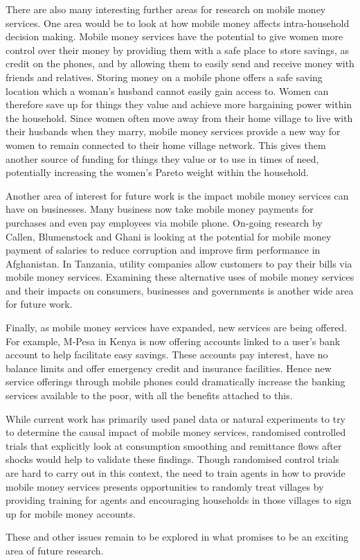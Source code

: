 There are also many interesting further areas for research on mobile money services. One area would be to look at how mobile money affects intra-household decision making. Mobile money services have the potential to give women more control over their money by providing them with a safe place to store savings, as credit on the phones, and by allowing them to easily send and receive money with friends and relatives. Storing money on a mobile phone offers a safe saving location which a woman's husband cannot easily gain access to. Women can therefore save up for things they value and achieve more bargaining power within the household. Since women often move away from their home village to live with their husbands when they marry, mobile money services provide a new way for women to remain connected to their home village network. This gives them another source of funding for things they value or to use in times of need, potentially increasing the women's Pareto weight within the household.

Another area of interest for future work is the impact mobile money services can have on businesses. Many business now take mobile money payments for purchases and even pay employees via mobile phone. On-going research by Callen, Blumenstock and Ghani is looking at the potential for mobile money payment of salaries to reduce corruption and improve firm performance in Afghanistan. In Tanzania, utility companies allow customers to pay their bills via mobile money services. Examining these alternative uses of mobile money services and their impacts on consumers, businesses and governments is another wide area for future work. 

Finally, as mobile money services have expanded, new services are being offered. For example, M-Pesa in Kenya is now offering accounts linked to a user's bank account to help facilitate easy savings. These accounts pay interest, have no balance limits and offer emergency credit and insurance facilities. Hence new service offerings through mobile phones could dramatically increase the banking services available to the poor, with all the benefits attached to this. 

While current work has primarily used panel data or natural experiments to try to determine the causal impact of mobile money services, randomised controlled trials that explicitly look at consumption smoothing and remittance flows after shocks would help to validate these findings. Though randomised control trials are hard to carry out in this context, the need to train agents in how to provide mobile money services presents opportunities to randomly treat villages by providing training for agents and encouraging households in those villages to sign up for mobile money accounts. 

These and other issues remain to be explored in what promises to be an exciting area of future research. 

